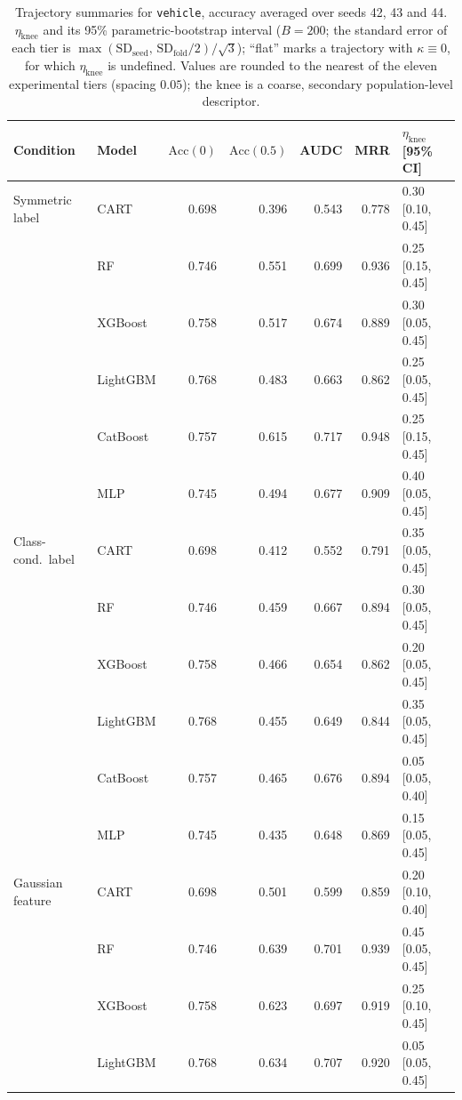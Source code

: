 \begin{table}[p]
\centering
\scriptsize
\setlength{\tabcolsep}{3.5pt}
\caption{Trajectory summaries for \texttt{vehicle}, accuracy averaged over seeds 42, 43 and 44. $\eta_{\mathrm{knee}}$ and its 95\% parametric-bootstrap interval ($B=200$; the standard error of each tier is $\max(\mathrm{SD}_{\mathrm{seed}},\,\mathrm{SD}_{\mathrm{fold}}/2)/\sqrt3$); ``flat'' marks a trajectory with $\kappa\equiv 0$, for which $\eta_{\mathrm{knee}}$ is undefined. Values are rounded to the nearest of the eleven experimental tiers (spacing $0.05$); the knee is a coarse, secondary population-level descriptor.}
\label{tab:traj_vehicle}
\begin{tabular}{@{}llrrrrl@{}}
\toprule
Condition & Model & $\mathrm{Acc}(0)$ & $\mathrm{Acc}(0.5)$ & AUDC & MRR & $\eta_{\mathrm{knee}}$ [95\% CI] \\
\midrule
Symmetric label & CART & 0.698 & 0.396 & 0.543 & 0.778 & 0.30 [0.10, 0.45] \\
 & RF & 0.746 & 0.551 & 0.699 & 0.936 & 0.25 [0.15, 0.45] \\
 & XGBoost & 0.758 & 0.517 & 0.674 & 0.889 & 0.30 [0.05, 0.45] \\
 & LightGBM & 0.768 & 0.483 & 0.663 & 0.862 & 0.25 [0.05, 0.45] \\
 & CatBoost & 0.757 & 0.615 & 0.717 & 0.948 & 0.25 [0.15, 0.45] \\
 & MLP & 0.745 & 0.494 & 0.677 & 0.909 & 0.40 [0.05, 0.45] \\
\midrule
Class-cond.\ label & CART & 0.698 & 0.412 & 0.552 & 0.791 & 0.35 [0.05, 0.45] \\
 & RF & 0.746 & 0.459 & 0.667 & 0.894 & 0.30 [0.05, 0.45] \\
 & XGBoost & 0.758 & 0.466 & 0.654 & 0.862 & 0.20 [0.05, 0.45] \\
 & LightGBM & 0.768 & 0.455 & 0.649 & 0.844 & 0.35 [0.05, 0.45] \\
 & CatBoost & 0.757 & 0.465 & 0.676 & 0.894 & 0.05 [0.05, 0.40] \\
 & MLP & 0.745 & 0.435 & 0.648 & 0.869 & 0.15 [0.05, 0.45] \\
\midrule
Gaussian feature & CART & 0.698 & 0.501 & 0.599 & 0.859 & 0.20 [0.10, 0.40] \\
 & RF & 0.746 & 0.639 & 0.701 & 0.939 & 0.45 [0.05, 0.45] \\
 & XGBoost & 0.758 & 0.623 & 0.697 & 0.919 & 0.25 [0.10, 0.45] \\
 & LightGBM & 0.768 & 0.634 & 0.707 & 0.920 & 0.05 [0.05, 0.45] \\

\end{tabular}
\end{table}
